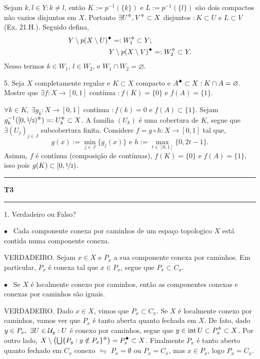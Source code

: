 \textcolor{gris}{Sejam \(k, l \in Y : k \neq l\), então \(K := p^{-1}(\{k\})\) e \(L := p^{-1}(\{l\})\) são dois compactos não vazios disjuntos em \(X\). Portanto \(\exists U\ab, V\ab\subset X\) disjuntos \(: K\subset U\) e \(L\subset V\) (Ex. 21.H.). Seguido defina, 
\begin{align*}
Y\setminus p(X\setminus U)\ce =: W_1\ab \subset Y; \hspace{2cm}\\
Y\setminus p(X\setminus V)\ce =: W_2\ab \subset Y.
\end{align*}
Nesso termos \(k \in W_1\), \(l \in W_2\), e \(W_1 \cap W_2 = \varnothing\). 
}  

5. Seja \(X \) completamente regular e \(K\subset X \) compacto e \(A\ce\subset X: K \cap A = \varnothing\). Mostre que \(\exists f: X \to [0,1]\) contínua \(: f(K) = \{0\}\) e \(f(A) = \{1\}\).  

\textcolor{gris}{\(\forall k \in K, \ \exists g_k : X \to [0,1] \) contínua \(: f(k )= 0 \) e \(f(A) \subset\{1\}\). Sejam \(g_k^{-1}([0, \nicefrac{1}{2})\ab) =: U_k\ab \subset X\). A familia \((U_k)\) é uma cobertura de \(K\), segue que \(\exists (U_j)_{j\in J}\) subcobertura finita. Considere \(f = g \circ h : X \to [0,1]\) tal que,   
\[g(x):= \min_{j\in J} \{g_j(x)\} \text{ \ e \ } h := \max_{t \in [0,1]}\{0, 2t - 1\}. \]  
Asimm, \(f\) é contínua (composição de contínuas), \(f(K) = \{0\}\) e \(f(A)= \{1\}\), isso pois \(g(K ) \subset [0, \nicefrac{1}{2})\). 
} 

\vspace{0.5cm}
  {\hrule \vspace{-0.15cm}
  \centering \textbf{T3} \vspace{0.1cm}
  \hrule}

1. Verdadeiro ou Falso?

\(\bullet \) \  Cada componente conexa por caminhos de um espaço topologico \(X\) está contida numa componente conexa. 

\textcolor{gris}{VERDADEIRO. Sejam \(x\in  X\) e \(P_x\)  a sua componente conexa por caminhos. Em particular, \(P_x\) é conexa tal que \(x\in P_x\), segue que \(P_x \subset C_x\).    
}

\(\bullet \) \ Se \(X\) é localmente conexo por caminhos, então as componentes conexas e conexas por caminhos são iguais. 

\textcolor{gris}{VERDADEIRO. Dado \(x\in X\), vimos que \(P_x \subset C_x\). Se \(X\) é localmente conexo por caminhos, vamos ver que \(P_x\) é tanto aberta quanto fechada em \(X\). De fato, dado \(y \in P_x, \ \exists U \in \mathcal{U}_y: U \) é conexo por caminhos, segue que \( y\in \operatorname{int}{U} \subset P_x\ab\subset X\). Por outro lado, \(X\setminus\left( \bigcup\{P_y : y \notin P_x \}\ab\right) = P_x\ce\subset X\). Finalmente \(P_x\) é tanto aberto quanto fechado em \(C_x\) conexo \(\leftrightharpoons\) \(P_x = \emptyset\) ou \(P_x = C_x\), mas \(x \in P_x\), logo \(P_x = C_x\).     }

